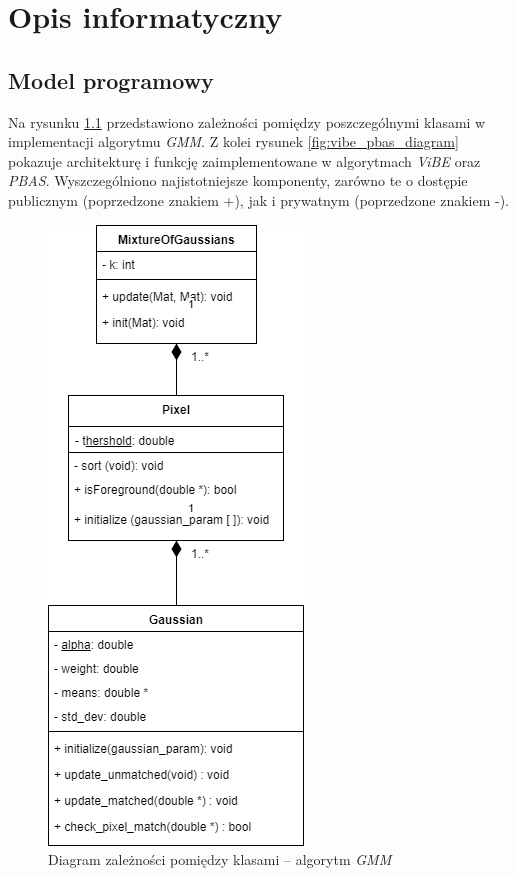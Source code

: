 \chapter{Opis informatyczny}
\label{appx:opis_informatyczny}

\section*{Model programowy}

Na rysunku \ref{fig:gmm_diagram} przedstawiono zależności pomiędzy poszczególnymi klasami w implementacji algorytmu \textit{GMM}. Z kolei rysunek \ref{fig:vibe_pbas_diagram} pokazuje architekturę i funkcję zaimplementowane w algorytmach \textit{ViBE} oraz \textit{PBAS}. Wyszczególniono najistotniejsze komponenty, zarówno te o dostępie publicznym (poprzedzone znakiem +), jak i prywatnym (poprzedzone znakiem -). 

		\begin{figure}[h!]
				\centering
				\includegraphics[scale = 0.6]{img/appx/gmm_architecture.png}
				\caption{Diagram zależności pomiędzy klasami -- algorytm \textit{GMM}}
				\label{fig:gmm_diagram}
		\end{figure}
		
